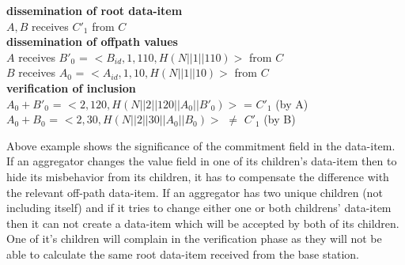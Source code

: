 \begin{exmp}
\begin{itemize}
		\textbf{dissemination of root data-item}\\
			$A,B$ receives $C'_{1}$ from $C$\\
		\textbf{dissemination of offpath values}\\
			$A$ receives $B'_{0}$ = $<B_{id},1,110, H(N||1||110)>$ from $C$\\
			$B$ receives $A_{0}$ = $<A_{id},1,10,H(N||1||10)>$ from $C$\\
		\textbf{verification of inclusion}\\
			$A_{0}+B'_{0}$ = $<2,120,H(N||2||120||A_{0}||B'_{0})>$ = $C'_{1}$ (by A)\\
			$A_{0}+B_{0}$ = $<2,30,H(N||2||30||A_{0}||B_{0})>$ $\neq$ $C'_{1} $ (by B)
	\end{itemize}
	\end{exmp}
Above example shows the significance of the commitment field in the data-item.
If an aggregator changes the value field in one of its children's data-item then to hide its misbehavior from its children, it has to compensate the difference with the relevant off-path data-item. 
If an aggregator has two unique children (not including itself) and if it tries to change either one or both childrens' data-item then it can not create a data-item which will be accepted by both of its children.
One of it's children will complain in the verification phase as they will not be able to calculate the same root data-item received from the base station.

	
  
  


